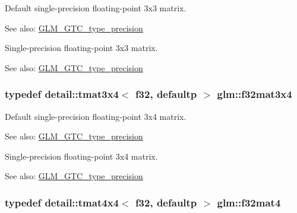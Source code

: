 Default single-precision floating-point 3x3 matrix. \begin{Desc}
\item[See also:]\hyperlink{group__gtc__type__precision}{GLM\_\-GTC\_\-type\_\-precision}\end{Desc}
Single-precision floating-point 3x3 matrix. \begin{Desc}
\item[See also:]\hyperlink{group__gtc__type__precision}{GLM\_\-GTC\_\-type\_\-precision} \end{Desc}
\hypertarget{group__gtc__type__precision_g9d953c44b7bf260d2f2e61d73dc2ab08}{
\subsubsection[f32mat3x4]{\setlength{\rightskip}{0pt plus 5cm}typedef detail::tmat3x4$<$ f32, defaultp $>$ {\bf glm::f32mat3x4}}}
\label{group__gtc__type__precision_g9d953c44b7bf260d2f2e61d73dc2ab08}


Default single-precision floating-point 3x4 matrix. \begin{Desc}
\item[See also:]\hyperlink{group__gtc__type__precision}{GLM\_\-GTC\_\-type\_\-precision}\end{Desc}
Single-precision floating-point 3x4 matrix. \begin{Desc}
\item[See also:]\hyperlink{group__gtc__type__precision}{GLM\_\-GTC\_\-type\_\-precision} \end{Desc}
\hypertarget{group__gtc__type__precision_g6bf98d2ab0eb4889e5190c26e1853292}{
\subsubsection[f32mat4]{\setlength{\rightskip}{0pt plus 5cm}typedef detail::tmat4x4$<$ f32, defaultp $>$ {\bf glm::f32mat4}}}
\label{group__gtc__type__precision_g6bf98d2ab0eb4889e5190c26e1853292}


